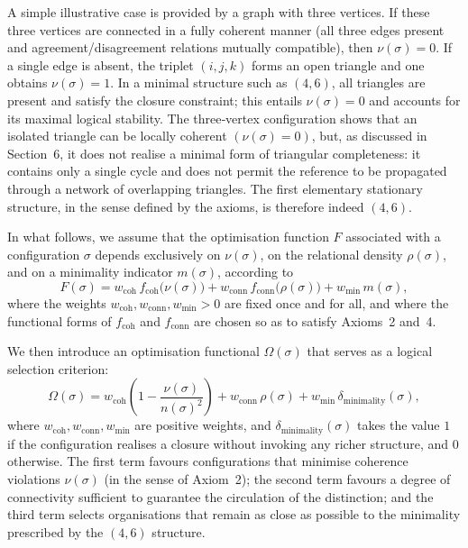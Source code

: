 \documentclass[11pt,a4paper]{article}
\begin{document}
A simple illustrative case is provided by a graph with three vertices. If these three vertices are connected in a fully coherent manner (all three edges present and agreement/disagreement relations mutually compatible), then \(\nu(\sigma) = 0\). If a single edge is absent, the triplet \((i,j,k)\) forms an open triangle and one obtains \(\nu(\sigma) = 1\). In a minimal structure such as \((4,6)\), all triangles are present and satisfy the closure constraint; this entails \(\nu(\sigma) = 0\) and accounts for its maximal logical stability. The three‑vertex configuration shows that an isolated triangle can be locally coherent \((\nu(\sigma) = 0)\), but, as discussed in Section~6, it does not realise a minimal form of triangular completeness: it contains only a single cycle and does not permit the reference to be propagated through a network of overlapping triangles. The first elementary stationary structure, in the sense defined by the axioms, is therefore indeed \((4,6)\).

In what follows, we assume that the optimisation function \(F\) associated with a configuration \(\sigma\) depends exclusively on \(\nu(\sigma)\), on the relational density \(\rho(\sigma)\), and on a minimality indicator \(m(\sigma)\), according to
\[
F(\sigma)
= w_{\mathrm{coh}}\, f_{\mathrm{coh}}\bigl(\nu(\sigma)\bigr)
+ w_{\mathrm{conn}}\, f_{\mathrm{conn}}\bigl(\rho(\sigma)\bigr)
+ w_{\mathrm{min}}\, m(\sigma),
\]
where the weights \(w_{\mathrm{coh}}, w_{\mathrm{conn}}, w_{\mathrm{min}} > 0\) are fixed once and for all, and where the functional forms of \(f_{\mathrm{coh}}\) and \(f_{\mathrm{conn}}\) are chosen so as to satisfy Axioms~2 and~4. 

We then introduce an optimisation functional \(\Omega(\sigma)\) that serves as a logical selection criterion:
\[
\Omega(\sigma)
= w_{\mathrm{coh}}\!\left(1 - \frac{\nu(\sigma)}{n(\sigma)^{2}}\right)
+ w_{\mathrm{conn}}\, \rho(\sigma)
+ w_{\mathrm{min}}\, \delta_{\text{minimality}}(\sigma),
\]
where \(w_{\mathrm{coh}}, w_{\mathrm{conn}}, w_{\mathrm{min}}\) are positive weights, and \(\delta_{\text{minimality}}(\sigma)\) takes the value \(1\) if the configuration realises a closure without invoking any richer structure, and \(0\) otherwise. The first term favours configurations that minimise coherence violations \(\nu(\sigma)\) (in the sense of Axiom~2); the second term favours a degree of connectivity sufficient to guarantee the circulation of the distinction; and the third term selects organisations that remain as close as possible to the minimality prescribed by the \((4,6)\) structure.
\end{document}
